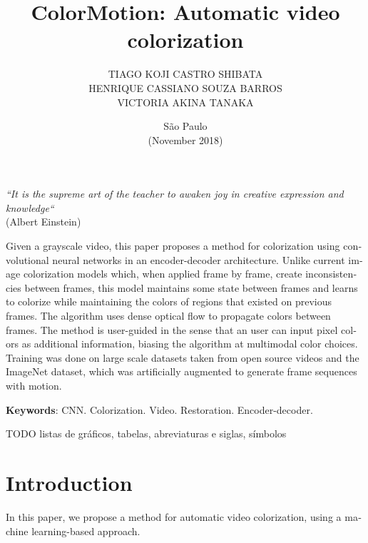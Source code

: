 \documentclass[12pt,openright,twoside,a4paper,english]{abntex2}
\author{TIAGO KOJI CASTRO SHIBATA\\
HENRIQUE CASSIANO SOUZA BARROS\\
VICTORIA AKINA TANAKA}
\title{ColorMotion: Automatic video colorization}
\date{São Paulo\\(November 2018)}
\begin{document}
\begin{otherlanguage}{english}

\imprimircapa
\imprimirfalsafolhaderosto
\imprimirfolhaderosto

\begin{epigrafe}
\begin{flushright}
\vspace*{\fill}

\textit{``It is the supreme art of the teacher to awaken joy in creative expression and knowledge``}\\
(Albert Einstein)
\par\end{flushright}\end{epigrafe}

\begin{resumo}
Given a grayscale video, this paper proposes a method for colorization using convolutional neural networks in an encoder-decoder architecture. Unlike current image colorization models which, when applied frame by frame, create inconsistencies between frames, this model maintains some state between frames and learns to colorize while maintaining the colors of regions that existed on previous frames. The algorithm uses dense optical flow to propagate colors between frames. The method is user-guided in the sense that an user can input pixel colors as additional information, biasing the algorithm at multimodal color choices. Training was done on large scale datasets taken from open source videos and the ImageNet dataset, which was artificially augmented to generate frame sequences with motion.
\vspace{\onelineskip}

\noindent
\textbf{Keywords}: CNN. Colorization. Video. Restoration. Encoder-decoder.
\end{resumo}

TODO listas de gráficos, tabelas, abreviaturas e siglas, símbolos
\cleardoublepage

\tableofcontents

\maketitle

\chapter{Introduction}
In this paper, we propose a method for automatic video colorization, using a machine learning-based approach.


\end{otherlanguage}
\end{document}
